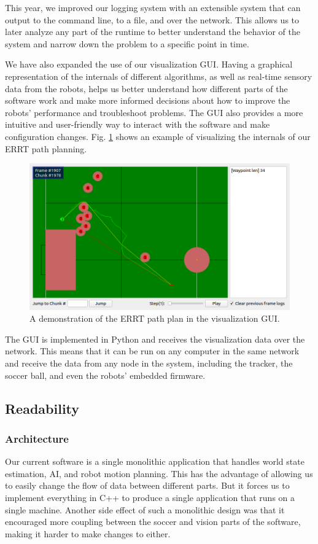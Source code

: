 \documentclass[runningheads]{llncs}
\begin{document}
This year, we improved our logging system with an extensible system that can output to the command line, to a file, and over the network. This allows us to later analyze any part of the runtime to better understand the behavior of the system and narrow down the problem to a specific point in time.

We have also expanded the use of our visualization GUI. Having a graphical representation of the internals of different algorithms, as well as real-time sensory data from the robots, helps us better understand how different parts of the software work and make more informed decisions about how to improve the robots' performance and troubleshoot problems. The GUI also provides a more intuitive and user-friendly way to interact with the software and make configuration changes. Fig. \ref{fig_visualizer} shows an example of visualizing the internals of our ERRT path planning.

\begin{figure}
    \includegraphics[width=\textwidth]{images/visual1.png}
    \caption{A demonstration of the ERRT path plan in the visualization GUI.}
    \label{fig_visualizer}
\end{figure}

The GUI is implemented in Python and receives the visualization data over the network. This means that it can be run on any computer in the same network and receive the data from any node in the system, including the tracker, the soccer ball, and even the robots' embedded firmware.


\subsection{Readability}

\subsubsection{Architecture}
Our current software is a single monolithic application that handles world state estimation, AI, and robot motion planning. This has the advantage of allowing us to easily change the flow of data between different parts. But it forces us to implement everything in C++ to produce a single application that runs on a single machine. Another side effect of such a monolithic design was that it encouraged more coupling between the soccer and vision parts of the software, making it harder to make changes to either.
\end{document}
